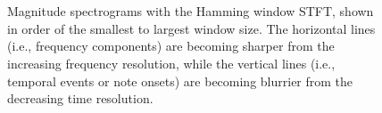 \documentclass[report.tex]{subfiles}
\begin{document}
\begin{figure}[ht]
	\centering
	\\
	\\
	\caption{Magnitude spectrograms with the Hamming window STFT, shown in order of the smallest to largest window size. The horizontal lines (i.e., frequency components) are becoming sharper from the increasing frequency resolution, while the vertical lines (i.e., temporal events or note onsets) are becoming blurrier from the decreasing time resolution.}
	\label{fig:stfts1}
\end{figure}
\end{document}
